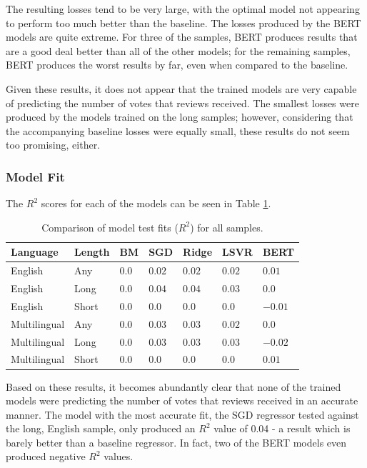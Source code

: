 The resulting losses tend to be very large, with the optimal model not appearing to perform too much better than the baseline. The losses produced by the BERT models are quite extreme. For three of the samples, BERT produces results that are a good deal better than all of the other models; for the remaining samples, BERT produces the worst results by far, even when compared to the baseline.

Given these results, it does not appear that the trained models are very capable of predicting the number of votes that reviews received. The smallest losses were produced by the models trained on the long samples; however, considering that the accompanying baseline losses were equally small, these results do not seem too promising, either.

\subsubsection{Model Fit}

The $R^2$ scores for each of the models can be seen in Table \ref{tab:Res_RF_Votes_CompFit}.

\begin{table}[ht]
    \centering
    \begin{tabular}{l l | l l l l l}
        \toprule
        \textbf{Language} & \textbf{Length} & \textbf{BM} & \textbf{SGD} & \textbf{Ridge} & \textbf{LSVR} & \textbf{BERT}\\\midrule
        English&Any&$0.0$&$\mathbf{0.02}$&$0.02$&$0.02$&$0.01$\\
        English&Long&$0.0$&$\mathbf{0.04}$&$0.04$&$0.03$&$0.0$\\
        English&Short&$\mathbf{0.0}$&$0.0$&$0.0$&$0.0$&$-0.01$\\\midrule
        Multilingual&Any&$0.0$&$0.03$&$\mathbf{0.03}$&$0.02$&$0.0$\\
        Multilingual&Long&$0.0$&$0.03$&$0.03$&$\mathbf{0.03}$&$-0.02$\\
        Multilingual&Short&$0.0$&$0.0$&$0.0$&$0.0$&$\mathbf{0.01}$\\
        \bottomrule
    \end{tabular}
    \caption{Comparison of model test fits ($R^2$) for all samples.}
    \label{tab:Res_RF_Votes_CompFit}
\end{table}

Based on these results, it becomes abundantly clear that none of the trained models were predicting the number of votes that reviews received in an accurate manner. The model with the most accurate fit, the SGD regressor tested against the long, English sample, only produced an $R^2$ value of 0.04 - a result which is barely better than a baseline regressor. In fact, two of the BERT models even produced negative $R^2$ values.

